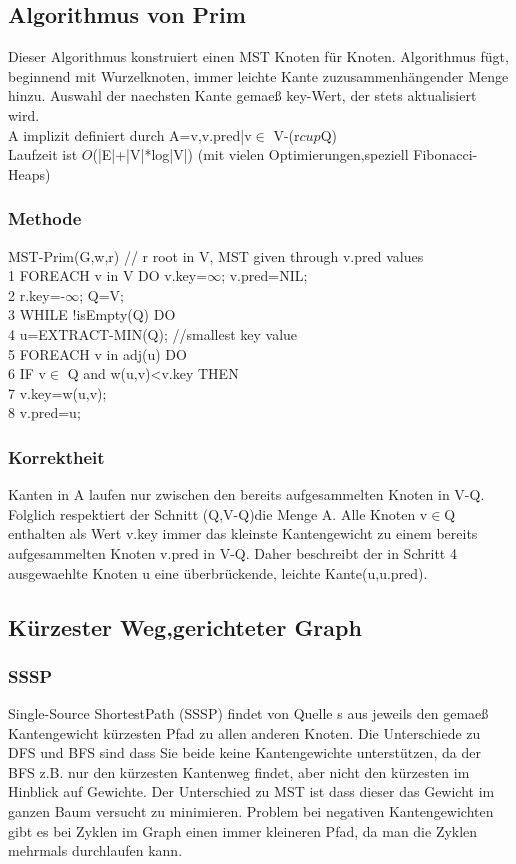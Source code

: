 \documentclass[jou,apacite]{apa6}
\begin{document}
\subsection{Algorithmus von Prim}
Dieser Algorithmus konstruiert einen MST Knoten für Knoten. Algorithmus fügt, beginnend mit Wurzelknoten, immer leichte Kante zuzusammenhängender Menge hinzu. Auswahl der naechsten Kante gemaeß key-Wert, der stets aktualisiert wird.\\
A implizit definiert durch A={{v,v.pred}|v$\in$ V-({r}$cup$Q)}\\
Laufzeit ist $O$(|E|+|V|*log|V|) (mit vielen Optimierungen,speziell Fibonacci-Heaps)
\subsubsection{Methode}
MST-Prim(G,w,r) // r root in V, MST given through v.pred values\\
1   FOREACH v in V DO {v.key=$\infty$; v.pred=NIL;}\\
2   r.key=-$\infty$; Q=V;\\
3   WHILE !isEmpty(Q) DO\\
4       u=EXTRACT-MIN(Q); //smallest key value\\
5       FOREACH v in adj(u) DO\\
6       IF v$\in$ Q and w({u,v})<v.key THEN\\
7           v.key=w({u,v}); \\
8           v.pred=u;\\
\subsubsection{Korrektheit}
Kanten in A laufen nur zwischen den bereits aufgesammelten Knoten in V-Q. Folglich respektiert der Schnitt (Q,V-Q)die Menge A. Alle Knoten v$\in$Q enthalten als Wert v.key immer das kleinste Kantengewicht zu einem bereits aufgesammelten Knoten v.pred in V-Q. Daher beschreibt der in Schritt 4 ausgewaehlte Knoten u eine überbrückende, leichte Kante(u,u.pred).

\subsection{Kürzester Weg,gerichteter Graph}
\subsubsection{SSSP}
Single-Source ShortestPath (SSSP) findet von Quelle s aus jeweils den gemaeß Kantengewicht kürzesten Pfad zu allen anderen Knoten. Die Unterschiede zu DFS und BFS sind dass Sie beide keine Kantengewichte unterstützen, da der BFS z.B. nur den kürzesten Kantenweg findet, aber nicht den kürzesten im Hinblick auf Gewichte. Der Unterschied zu MST ist dass dieser das Gewicht im ganzen Baum versucht zu minimieren. {Problem} bei negativen Kantengewichten gibt es bei Zyklen im Graph einen immer kleineren Pfad, da man die Zyklen mehrmals durchlaufen kann.
\end{document}
